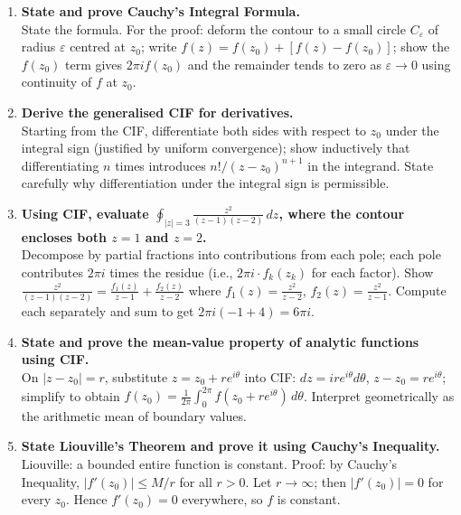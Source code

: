 \documentclass[12pt,a4paper]{article}
\begin{document}
\begin{enumerate}[label=\textbf{D\arabic*.}, leftmargin=*]

  \item \textbf{State and prove Cauchy's Integral Formula.}\\
  State the formula. For the proof: deform the contour to a small circle $C_\varepsilon$
  of radius $\varepsilon$ centred at $z_0$; write $f(z) = f(z_0) + [f(z) - f(z_0)]$;
  show the $f(z_0)$ term gives $2\pi i f(z_0)$ and the remainder tends to zero as
  $\varepsilon \to 0$ using continuity of $f$ at $z_0$.

  \item \textbf{Derive the generalised CIF for derivatives.} \\
  Starting from the CIF, differentiate both sides with respect to $z_0$ under
  the integral sign (justified by uniform convergence); show inductively that
  differentiating $n$ times introduces $n!/(z - z_0)^{n+1}$ in the integrand.
  State carefully why differentiation under the integral sign is permissible.

  \item \textbf{Using CIF, evaluate $\displaystyle\oint_{|z|=3}\frac{z^2}{(z-1)(z-2)}\,dz$,
  where the contour encloses both $z=1$ and $z=2$.}\\
  Decompose by partial fractions into contributions from each pole; each pole contributes
  $2\pi i$ times the residue (i.e., $2\pi i \cdot f_k(z_k)$ for each factor).
  Show $\frac{z^2}{(z-1)(z-2)} = \frac{f_1(z)}{z-1} + \frac{f_2(z)}{z-2}$
  where $f_1(z) = \frac{z^2}{z-2}$, $f_2(z) = \frac{z^2}{z-1}$.
  Compute each separately and sum to get $2\pi i(-1 + 4) = 6\pi i$.

  \item \textbf{State and prove the mean-value property of analytic functions using CIF.}\\
  On $|z - z_0| = r$, substitute $z = z_0 + re^{i\theta}$ into CIF:
  $dz = ire^{i\theta}d\theta$, $z - z_0 = re^{i\theta}$; simplify to obtain
  $f(z_0) = \frac{1}{2\pi}\int_0^{2\pi} f(z_0 + re^{i\theta})\,d\theta$.
  Interpret geometrically as the arithmetic mean of boundary values.

  \item \textbf{State Liouville's Theorem and prove it using Cauchy's Inequality.}\\
  Liouville: a bounded entire function is constant.
  Proof: by Cauchy's Inequality, $|f'(z_0)| \leq M/r$ for all $r > 0$.
  Let $r \to \infty$; then $|f'(z_0)| = 0$ for every $z_0$.
  Hence $f'(z_0) = 0$ everywhere, so $f$ is constant.

\end{enumerate}
\end{document}
